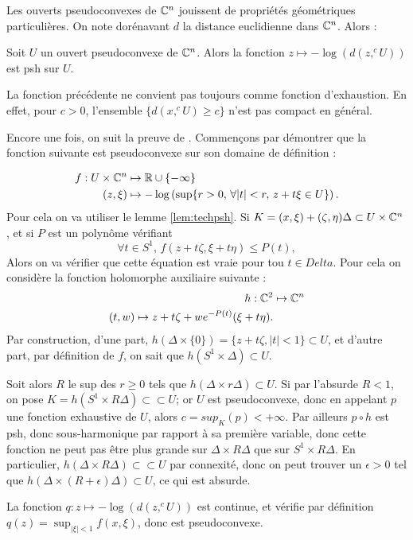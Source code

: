 Les ouverts pseudoconvexes de $\mathbb{C}^n$ jouissent de propriétés géométriques particulières. On note dorénavant $d$ la distance euclidienne dans $\mathbb{C}^n$. Alors :
\begin{prop}
	Soit $U$ un ouvert pseudoconvexe de $\mathbb{C}^n$. Alors la fonction $z \mapsto -\log(d(z,^cU))$ est psh sur $U$.
\end{prop}
\begin{rem}
	La fonction précédente ne convient pas toujours comme fonction d'exhaustion. En effet, pour $c > 0$, l'ensemble $\{d(x,^cU) \geq c\}$ n'est pas compact en général.
\end{rem}
\begin{preuve}
	Encore une fois, on suit la preuve de \cite{demailly1997complex}. Commençons par démontrer que la fonction suivante est pseudoconvexe sur son domaine de définition :
	
\begin{align*}
	f: U \times \mathbb{C}^n &\mapsto \mathbb{R}\cup \{-\infty \}\\
	(z,\xi) &\mapsto -\log \left(\sup\{r >0,\,\forall |t| < r,\,z+t\xi \in U \} \right).
\end{align*}
Pour cela on va utiliser le lemme \ref{lem:techpsh}. Si $K=(x,\xi)+(\zeta, \eta)\Delta \subset U \times \mathbb{C}^n$, et si $P$ est un polynôme vérifiant
\begin{equation*}
	\forall t \in S^1,\,f(z+t\zeta,\xi+t\eta) \leq P(t),
\end{equation*}
Alors on va vérifier que cette équation est vraie pour tou $t \in Delta$. Pour cela on considère la fonction holomorphe auxiliaire suivante :
\begin{align*}
	h:\mathbb{C}^2 &\mapsto \mathbb{C}^n\\
	(t,w)\mapsto z+t\zeta + we^{-P(t)}(\xi+t\eta).
\end{align*}
Par construction, d'une part, $h(\Delta \times \{0\}) = \{z+t\zeta,|t| <1 \} \subset U$, et d'autre part, par définition de $f$, on sait que $h(S^1 \times \Delta) \subset U$.

Soit alors $R$ le sup des $r \geq 0$ tels que $h(\Delta \times r\Delta) \subset U$. Si par l'absurde $R<1$, on pose $K=h(S^1 \times R\Delta) \subset \subset U$; or $U$ est pseudoconvexe, donc en appelant $p$ une fonction exhaustive de $U$, alors $c=sup_K(p)<+\infty$. Par ailleurs $p\circ h$ est psh, donc sous-harmonique par rapport à sa première variable, donc cette fonction ne peut pas être plus grande sur $\Delta \times R\Delta$ que sur $S^1 \times R\Delta$. En particulier, $h(\Delta \times R\Delta) \subset \subset U$ par connexité, donc on peut trouver un $\epsilon>0$ tel que $h(\Delta \times (R+\epsilon)\Delta) \subset U$, ce qui est absurde.

La fonction $q:z \mapsto -\log(d(z,^cU))$ est continue, et vérifie par définition $q(z)=\sup_{|\xi|<1}f(x,\xi)$, donc est pseudoconvexe.
\end{preuve}

